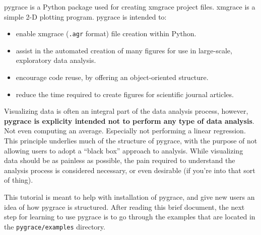 pygrace is a Python package used for creating xmgrace project files. xmgrace is
a simple 2-D plotting program.  pygrace is intended to:
\begin{itemize}
\item enable xmgrace ({\tt .agr} format) file creation within Python.
\item assist in the automated creation of many figures for use in
  large-scale, exploratory data analysis.
\item encourage code reuse, by offering an object-oriented structure.
\item reduce the time required to create figures for scientific
  journal articles.
\end{itemize}
Visualizing data is often an integral part of the data analysis
process, however, \textbf{pygrace is explicity intended not to perform
  any type of data analysis}.  Not even computing an average.
Especially not performing a linear regression.  This principle
underlies much of the structure of pygrace, with the purpose of not
allowing users to adopt a ``black box'' approach to analysis.  While
visualizing data should be as painless as possible, the pain required
to understand the analysis process is considered necessary, or even
desirable (if you're into that sort of thing).

This tutorial is meant to help with installation of pygrace, and give
new users an idea of how pygrace is structured.  After reading this
brief document, the next step for learning to use pygrace is to go
through the examples that are located in the {\tt pygrace/examples}
directory.
